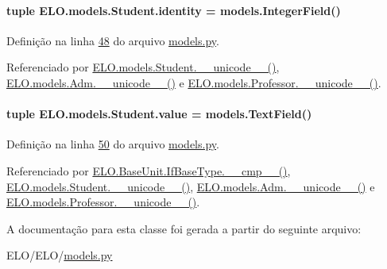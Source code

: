 \hypertarget{classELO_1_1models_1_1Student_a20a7789a2b0f5b7d0c98453dcf38bc4e}{
\paragraph[{identity}]{\setlength{\rightskip}{0pt plus 5cm}tuple E\-L\-O.\-models.\-Student.\-identity = models.\-Integer\-Field()\hspace{0.3cm}{\ttfamily [static]}}}\label{classELO_1_1models_1_1Student_a20a7789a2b0f5b7d0c98453dcf38bc4e}


Definição na linha \hyperlink{ELO_2models_8py_source_l00048}{48} do arquivo \hyperlink{ELO_2models_8py_source}{models.\-py}.



Referenciado por \hyperlink{classELO_1_1models_1_1Student_a2f51785c1beb3b45269a8678d97ec783}{E\-L\-O.\-models.\-Student.\-\_\-\-\_\-unicode\-\_\-\-\_\-()}, \hyperlink{classELO_1_1models_1_1Adm_a3541c3ae12b8d2da3f44ac6be00a23e6}{E\-L\-O.\-models.\-Adm.\-\_\-\-\_\-unicode\-\_\-\-\_\-()} e \hyperlink{classELO_1_1models_1_1Professor_aefc9d63d429e19ec3487a7879879f29d}{E\-L\-O.\-models.\-Professor.\-\_\-\-\_\-unicode\-\_\-\-\_\-()}.

\hypertarget{classELO_1_1models_1_1Student_a201226779dce6e064cb16bd92ed016e2}{
\paragraph[{value}]{\setlength{\rightskip}{0pt plus 5cm}tuple E\-L\-O.\-models.\-Student.\-value = models.\-Text\-Field()\hspace{0.3cm}{\ttfamily [static]}}}\label{classELO_1_1models_1_1Student_a201226779dce6e064cb16bd92ed016e2}


Definição na linha \hyperlink{ELO_2models_8py_source_l00050}{50} do arquivo \hyperlink{ELO_2models_8py_source}{models.\-py}.



Referenciado por \hyperlink{classELO_1_1BaseUnit_1_1IfBaseType_a69c338f6f1574bd3524e9d59ebc17a7c}{E\-L\-O.\-Base\-Unit.\-If\-Base\-Type.\-\_\-\-\_\-cmp\-\_\-\-\_\-()}, \hyperlink{classELO_1_1models_1_1Student_a2f51785c1beb3b45269a8678d97ec783}{E\-L\-O.\-models.\-Student.\-\_\-\-\_\-unicode\-\_\-\-\_\-()}, \hyperlink{classELO_1_1models_1_1Adm_a3541c3ae12b8d2da3f44ac6be00a23e6}{E\-L\-O.\-models.\-Adm.\-\_\-\-\_\-unicode\-\_\-\-\_\-()} e \hyperlink{classELO_1_1models_1_1Professor_aefc9d63d429e19ec3487a7879879f29d}{E\-L\-O.\-models.\-Professor.\-\_\-\-\_\-unicode\-\_\-\-\_\-()}.



A documentação para esta classe foi gerada a partir do seguinte arquivo\-:\begin{DoxyCompactItemize}
\item 
E\-L\-O/\-E\-L\-O/\hyperlink{ELO_2models_8py}{models.\-py}\end{DoxyCompactItemize}
